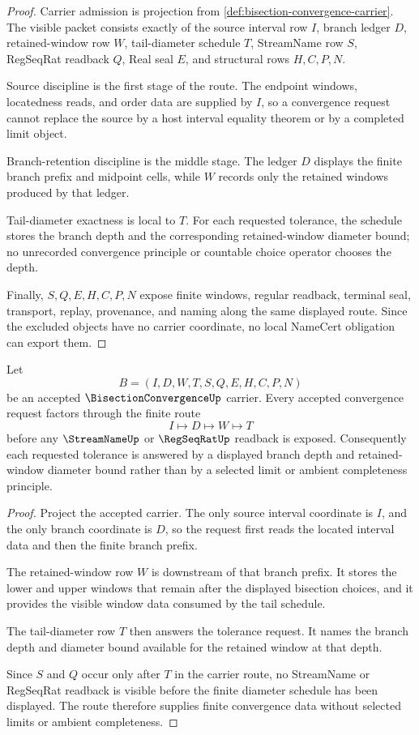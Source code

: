 \begin{proof}
Carrier admission is projection from \autoref{def:bisection-convergence-carrier}. The visible packet consists exactly of the source interval row $I$, branch ledger $D$, retained-window row $W$, tail-diameter schedule $T$, StreamName row $S$, RegSeqRat readback $Q$, Real seal $E$, and structural rows $H,C,P,N$.

Source discipline is the first stage of the route. The endpoint windows, locatedness reads, and order data are supplied by $I$, so a convergence request cannot replace the source by a host interval equality theorem or by a completed limit object.

Branch-retention discipline is the middle stage. The ledger $D$ displays the finite branch prefix and midpoint cells, while $W$ records only the retained windows produced by that ledger.

Tail-diameter exactness is local to $T$. For each requested tolerance, the schedule stores the branch depth and the corresponding retained-window diameter bound; no unrecorded convergence principle or countable choice operator chooses the depth.

Finally, $S,Q,E,H,C,P,N$ expose finite windows, regular readback, terminal seal, transport, replay, provenance, and naming along the same displayed route. Since the excluded objects have no carrier coordinate, no local NameCert obligation can export them.
\end{proof}

\begin{theorem}
\label{thm:bisection-convergence-tail-diameter}
Let
$$
B=(I,D,W,T,S,Q,E,H,C,P,N)
$$
be an accepted $\BisectionConvergenceUp$ carrier. Every accepted convergence request factors through the finite route
$$
I \longmapsto D \longmapsto W \longmapsto T
$$
before any $\StreamNameUp$ or $\RegSeqRatUp$ readback is exposed. Consequently each requested tolerance is answered by a displayed branch depth and retained-window diameter bound rather than by a selected limit or ambient completeness principle.
\end{theorem}
\begin{proof}
Project the accepted carrier. The only source interval coordinate is $I$, and the only branch coordinate is $D$, so the request first reads the located interval data and then the finite branch prefix.

The retained-window row $W$ is downstream of that branch prefix. It stores the lower and upper windows that remain after the displayed bisection choices, and it provides the visible window data consumed by the tail schedule.

The tail-diameter row $T$ then answers the tolerance request. It names the branch depth and diameter bound available for the retained window at that depth.

Since $S$ and $Q$ occur only after $T$ in the carrier route, no StreamName or RegSeqRat readback is visible before the finite diameter schedule has been displayed. The route therefore supplies finite convergence data without selected limits or ambient completeness.
\end{proof}

